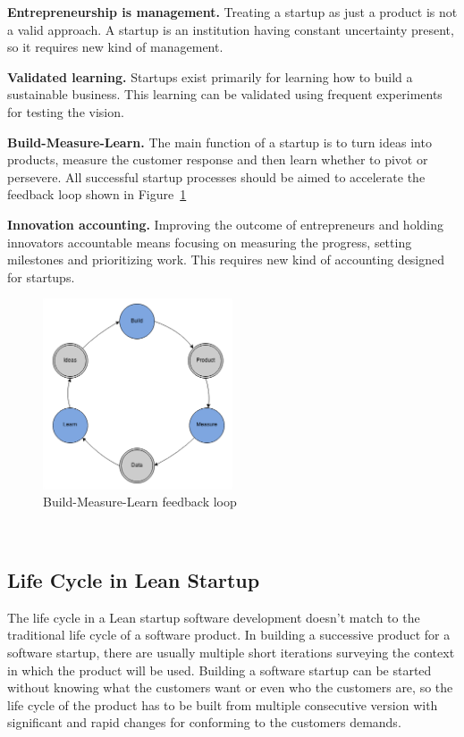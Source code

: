 \textbf{Entrepreneurship is management.} Treating a startup as just a product is not a valid approach. A startup is an institution having constant uncertainty present, so it requires new kind of management.

\textbf{Validated learning.} Startups exist primarily for learning how to build a sustainable business. This learning can be validated using frequent experiments for testing the vision.

\textbf{Build-Measure-Learn.} The main function of a startup is to turn ideas into products, measure the customer response and then learn whether to pivot or persevere. All successful startup processes should be aimed to accelerate the feedback loop shown in Figure~\ref{fig:feedback-loop}

\textbf{Innovation accounting.} Improving the outcome of entrepreneurs and holding innovators accountable means focusing on measuring the progress, setting milestones and prioritizing work. This requires new kind of accounting designed for startups.

\begin{figure}[t]
\begin{center}
\includegraphics[width=0.5\textwidth]{image/feedback-loop.png}
\end{center}
\caption{Build-Measure-Learn feedback loop}
\label{fig:feedback-loop}
\end{figure}


~\cite{ries2011lean}

 \subsection{Life Cycle in Lean Startup}

 
 The life cycle in a Lean startup software development doesn't match to the traditional life cycle of a software product. In building a successive product for a software startup, there are usually multiple short iterations surveying the context in which the product will be used. Building a software startup can be started without knowing what the customers want or even who the customers are, so the life cycle of the product has to be built from multiple consecutive version with significant and rapid changes for conforming to the customers demands.

